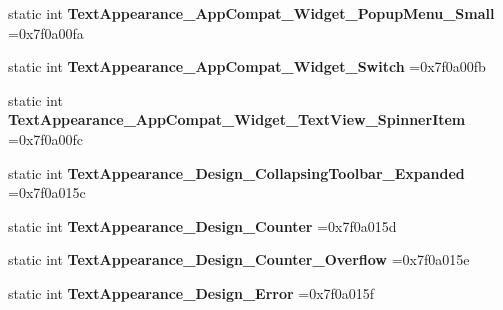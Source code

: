 \begin{DoxyCompactItemize}
\item 
\mbox{\label{classandroid_1_1support_1_1v7_1_1recyclerview_1_1R_1_1style_adce78c63818bfa2244894c55d376db49}} 
static int {\bfseries Text\+Appearance\+\_\+\+App\+Compat\+\_\+\+Widget\+\_\+\+Popup\+Menu\+\_\+\+Small} =0x7f0a00fa
\item 
\mbox{\label{classandroid_1_1support_1_1v7_1_1recyclerview_1_1R_1_1style_a1259a2a553e265a76b658612126fcc87}} 
static int {\bfseries Text\+Appearance\+\_\+\+App\+Compat\+\_\+\+Widget\+\_\+\+Switch} =0x7f0a00fb
\item 
\mbox{\label{classandroid_1_1support_1_1v7_1_1recyclerview_1_1R_1_1style_a946cbea2e6b47c12eebb80b549bd1e9c}} 
static int {\bfseries Text\+Appearance\+\_\+\+App\+Compat\+\_\+\+Widget\+\_\+\+Text\+View\+\_\+\+Spinner\+Item} =0x7f0a00fc
\item 
\mbox{\label{classandroid_1_1support_1_1v7_1_1recyclerview_1_1R_1_1style_a5c4ff29cbdc41e42a51c888c280905c7}} 
static int {\bfseries Text\+Appearance\+\_\+\+Design\+\_\+\+Collapsing\+Toolbar\+\_\+\+Expanded} =0x7f0a015c
\item 
\mbox{\label{classandroid_1_1support_1_1v7_1_1recyclerview_1_1R_1_1style_a05ca69b6d514021a5cbd8dea0deba950}} 
static int {\bfseries Text\+Appearance\+\_\+\+Design\+\_\+\+Counter} =0x7f0a015d
\item 
\mbox{\label{classandroid_1_1support_1_1v7_1_1recyclerview_1_1R_1_1style_adab5c79cd9f2814a238a6f71150793da}} 
static int {\bfseries Text\+Appearance\+\_\+\+Design\+\_\+\+Counter\+\_\+\+Overflow} =0x7f0a015e
\item 
\mbox{\label{classandroid_1_1support_1_1v7_1_1recyclerview_1_1R_1_1style_ac6afec43c33d7fb0bab6997f348e69cc}} 
static int {\bfseries Text\+Appearance\+\_\+\+Design\+\_\+\+Error} =0x7f0a015f
\item 

\end{DoxyCompactItemize}

